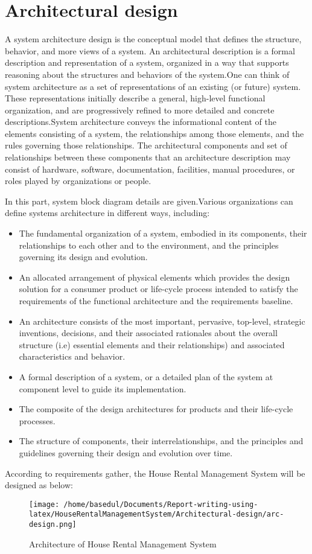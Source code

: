 \documentclass[12pt,a4paper]{report}
\newcommand\tab[1][0cm]{\hspace*{#1}}
\begin{document}
\section{Architectural design}
\tab A system architecture \cite{Ref:11} design is the conceptual model that defines the structure, behavior, and more views of a system. An architectural description is a formal description and representation of a system, organized in a way that supports reasoning about the structures and behaviors of the system.One can think of system architecture as a set of representations of an existing (or future) system. These representations initially describe a general, high-level functional organization, and are progressively refined to more detailed and concrete descriptions.System architecture conveys the informational content of the elements consisting of a system, the relationships among those elements, and the rules governing those relationships. The architectural components and set of relationships between these components that an architecture description may consist of hardware, software, documentation, facilities, manual procedures, or roles played by organizations or people.{In this part, system block diagram details are given.Various organizations can define systems architecture in different ways, including:\begin{itemize}
	\item The fundamental organization of a system, embodied in its components, their relationships to each other and to the environment, and the principles governing its design and evolution.
	\item An allocated arrangement of physical elements which provides the design solution for a consumer product or life-cycle process intended to satisfy the requirements of the functional architecture and the requirements baseline.
	\item An architecture consists of the most important, pervasive, top-level, strategic inventions, decisions, and their associated rationales about the overall structure (i.e) essential elements and their relationships) and associated characteristics and behavior.
	\item A formal description of a system, or a detailed plan of the system at component level to guide its implementation.
	\item The composite of the design architectures for products and their life-cycle processes.
	\item The structure of components, their interrelationships, and the principles and guidelines governing their design and evolution over time.
\end{itemize}According to requirements
gather, the House Rental Management System will be designed as below:}
	\begin{figure}[H]
		\centering
		\texttt{[image: /home/basedul/Documents/Report-writing-using-latex/HouseRentalManagementSystem/Architectural-design/arc-design.png]}
		\caption{\hspace{0.35em}Architecture of House Rental Management System}
		\label{fig:archi} 
	\end{figure}
		
\end{document}
